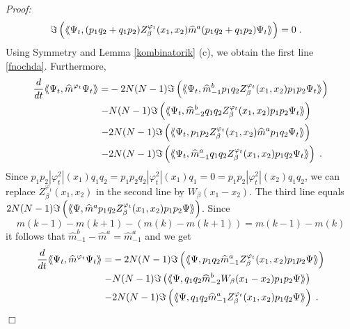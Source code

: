 \documentclass[11pt, english, american]{article}
\newcommand{\laa}{\langle\hspace{-0.08cm}\langle}
\newcommand{\raa}{\rangle\hspace{-0.08cm}\rangle}
\newenvironment{proof}{\emph{Proof:}}{\begin{flushright} $ \Box $ \end{flushright}}
\renewcommand{\phi}{\varphi}
\newcommand{\potdiff}{Z}
\begin{document}
\begin{proof}
\begin{align*}
\Im\left(\laa\Psi_t ,(p_{1}q_{2}+q_{1}p_{2})\potdiff^{\phi_t}_\beta(x_1,x_2)\widehat{m}^a(p_{1}q_{2}+q_1p_2)
\Psi_t\raa\right)&=0\;.
\end{align*}
Using Symmetry and Lemma \ref{kombinatorik} (c), we obtain the first line  \eqref{fnochda}.
Furthermore,
\begin{align*}
\frac{d}{dt}\laa\Psi_t,\widehat{m}^{\phi_t}\Psi_t\raa%
%
=&-2N(N-1)\Im\left(\laa\Psi_t , \widehat{m}^b_{-1}p_{1}q_{2}\potdiff^{\phi_t}_\beta(x_1,x_2)p_{1}p_{2}
\Psi_t\raa\right)
%
\\
-&N(N-1)\Im\left(\laa\Psi_t ,\widehat{m}^b_{-2}q_{1}q_{2}\potdiff^{\phi_t}_\beta(x_1,x_2)p_{1}p_{2}
\Psi_t\raa\right)
%
\\
-&2N(N-1)\Im\left(\laa\Psi_t ,p_{1}p_{2}\potdiff^{\phi_t}_\beta(x_1,x_2) \widehat{m}^ap_{1}q_{2}
\Psi_t\raa\right)
%
\\
-&2N(N-1)\Im\left(\laa\Psi_t ,\widehat{m}^a_{-1}q_{1}q_{2}\potdiff^{\phi_t}_\beta(x_1,x_2)p_{1}q_{2}
\Psi_t\raa\right)\;.
\end{align*}
Since $p_1p_2|\phi_t^2|(x_1)q_1q_2=p_1p_2q_2|\phi_t^2|(x_1)q_1=0=p_1p_2|\phi_t^2|(x_2)q_1q_2$, we can replace $\potdiff^{\phi_t}_\beta(x_1,x_2)$ in the second line by $W_\beta(x_1-x_2)$.
The third line equals $2N(N-1)\Im\left(\laa\Psi ,\widehat{m}^a p_{1}q_{2}\potdiff^{\phi_t}_\beta(x_1,x_2) p_{1}p_{2}
\Psi\raa\right)$. Since
$$m(k-1)-m(k+1)-\left(m(k)-m(k+1)\right)=m(k-1)-m(k)$$
it follows that $\widehat{m}^b_{-1}-\widehat{m}^a=\widehat{m}^a_{-1}$ and we get
\begin{align*}
\frac{d}{dt}\laa\Psi_t,\widehat{m}^{\phi_t}\Psi_t\raa%
%
=&-2N(N-1)\Im\left(\laa\Psi ,p_{1}q_{2}\widehat{m}^a_{-1}\potdiff^{\phi_t}_\beta(x_1,x_2)p_{1}p_{2}
\Psi\raa\right)
%
\\\nonumber
-&N(N-1)\Im\left(\laa\Psi ,q_{1}q_{2}\widehat{m}^b_{-2}W_\beta(x_1-x_2) p_{1}p_{2}
\Psi\raa\right)
%
\\\nonumber
-&2N(N-1)\Im\left(\laa\Psi ,q_{1}q_{2}\widehat{m}^a_{-1}\potdiff^{\phi_t}_\beta(x_1,x_2)p_{1}q_{2}
\Psi\raa\right)\;.
\end{align*}






\end{proof}
\end{document}

